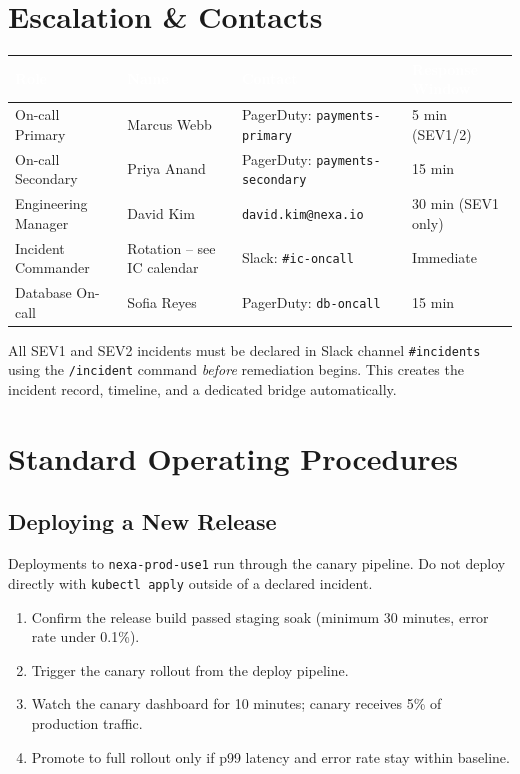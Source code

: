 \documentclass[11pt,a4paper,parskip=half]{scrartcl}
\begin{document}
\section{Escalation \& Contacts}

\begin{tabularx}{\linewidth}{@{}l l l X@{}}
\toprule
\rowcolor{navy!85}
\textcolor{white}{\textbf{Role}} & \textcolor{white}{\textbf{Name}} & \textcolor{white}{\textbf{Contact}} & \textcolor{white}{\textbf{Response Window}} \\
\midrule
On-call Primary & Marcus Webb & PagerDuty: \texttt{payments-primary} & 5 min (SEV1/2) \\
\rowcolor{navy!4}
On-call Secondary & Priya Anand & PagerDuty: \texttt{payments-secondary} & 15 min \\
Engineering Manager & David Kim & \texttt{david.kim@nexa.io} & 30 min (SEV1 only) \\
\rowcolor{navy!4}
Incident Commander & Rotation -- see IC calendar & Slack: \texttt{\#ic-oncall} & Immediate \\
Database On-call & Sofia Reyes & PagerDuty: \texttt{db-oncall} & 15 min \\
\bottomrule
\end{tabularx}

\begin{notebox}
All SEV1 and SEV2 incidents must be declared in Slack channel \texttt{\#incidents} using
the \texttt{/incident} command \emph{before} remediation begins. This creates the incident
record, timeline, and a dedicated bridge automatically.
\end{notebox}

\section{Standard Operating Procedures}

\subsection{Deploying a New Release}

Deployments to \texttt{nexa-prod-use1} run through the canary pipeline. Do not deploy
directly with \texttt{kubectl apply} outside of a declared incident.

\begin{enumerate}[leftmargin=*]
  \item Confirm the release build passed staging soak (minimum 30 minutes, error rate under 0.1\%).
  \item Trigger the canary rollout from the deploy pipeline.
  \item Watch the canary dashboard for 10 minutes; canary receives 5\% of production traffic.
  \item Promote to full rollout only if p99 latency and error rate stay within baseline.
\end{enumerate}
\end{document}

